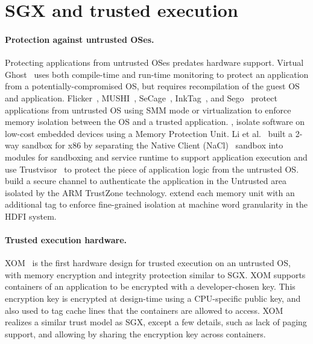 \section{SGX and trusted execution}
\label{sec:related:sgx}

%
%
%


\paragraph{Protection against untrusted OSes.}
Protecting applications from untrusted OSes predates hardware support. 
Virtual Ghost~\cite{criswell2014virtualghost} uses both compile-time and run-time monitoring to protect an application
from a potentially-compromised OS, but requires recompilation of the guest OS and application.
Flicker~\cite{flicker}, MUSHI~\cite{zhang2012mushi}, SeCage~\cite{liu15secage}, InkTag~\cite{inktag}, and Sego~\cite{kwon16sego-sigops} protect applications from untrusted OS using SMM mode or virtualization
to enforce memory isolation between the OS and a trusted application.
\citet{koeberl2014trustlite}, isolate software on low-cost embedded devices using a Memory Protection Unit.
Li et al.~\cite{li2014minibox} built a 2-way sandbox for x86 by separating the Native Client (NaCl)~\cite{yee2009native} sandbox into modules for sandboxing and service runtime to support application execution and use Trustvisor~\cite{trustvisor} to protect the piece of application logic from the untrusted OS.
\citet{jang2015secret} build a secure channel to authenticate the application in the Untrusted area isolated by the ARM TrustZone technology.
\citet{songhdfi} extend each memory unit with an additional tag
to enforce fine-grained isolation at machine word granularity in the HDFI system.

\paragraph{Trusted execution hardware.}
XOM~\cite{lie2003implementing} is the first hardware design for trusted execution on an untrusted OS,
with memory encryption and integrity protection similar to SGX. XOM supports containers of an application to be encrypted with a developer-chosen key. This encryption key is encrypted at design-time using a CPU-specific public key, and also used to tag cache lines that the containers are allowed to access.
XOM realizes a similar trust model as SGX, except a few details, such as lack of paging support, and allowing  by sharing the encryption key across containers.


